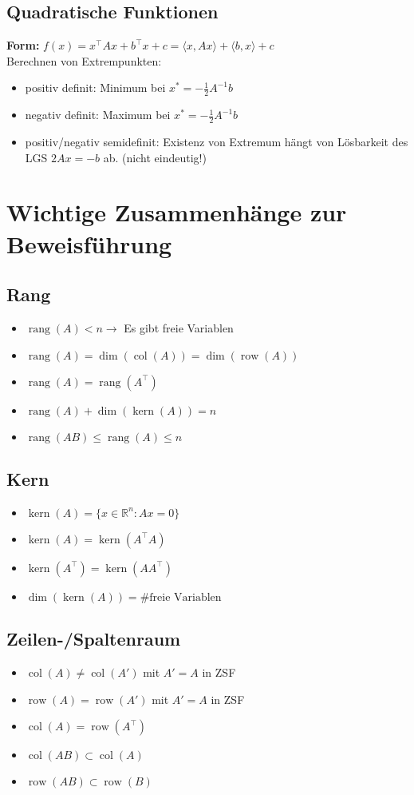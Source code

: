 \documentclass[german, 6pt]{latex4ei/latex4ei_sheet}
\DeclareMathOperator{\rang}{rang}
\DeclareMathOperator{\col}{col}
\DeclareMathOperator{\row}{row}
\DeclareMathOperator{\Kern}{kern}
\begin{document}
\subsection{Quadratische Funktionen}
\textbf{Form:} $f(x)=x^{\top}Ax+b^{\top}x+c = \langle x,Ax \rangle + \langle b,x \rangle + c$\\
Berechnen von Extrempunkten:
\begin{itemize}\itemsep0pt
\item positiv definit: Minimum bei $x^{*}=-\frac{1}{2}A^{-1}b$
\item negativ definit: Maximum bei $x^{*}=-\frac{1}{2}A^{-1}b$
\item positiv/negativ semidefinit: Existenz von Extremum hängt von Lösbarkeit des LGS $2Ax=-b$ ab. (nicht eindeutig!)
\end{itemize}

\begin{minipage}{\columnwidth}
\section{Wichtige Zusammenhänge zur Beweisführung}
\subsection{Rang}
\begin{itemize}
	\item $\rang(A)<n \rightarrow$ Es gibt freie Variablen
	\item $\rang(A)=\dim(\col(A))=\dim(\row(A))$
	\item $\rang(A)=\rang(A^\top)$
	\item $\rang(A)+\dim(\Kern(A))=n$
	\item $\rang(AB)\leq \rang(A) \leq n$
\end{itemize}
\end{minipage}
\subsection{Kern}
\begin{itemize}
	\item $\Kern(A)=\{x\in \mathbb{R}^n: Ax=0\}$
	\item $\Kern(A)=\Kern(A^\top A)$
	\item $\Kern(A^\top) = \Kern(AA^\top )$
	\item $\dim(\Kern(A))=\text{\#freie Variablen}$
\end{itemize}
\subsection{Zeilen-/Spaltenraum}
\begin{itemize}
	\item $\col(A)\neq \col(A')$ mit $A'=A$ in ZSF
	\item $\row(A)=\row(A')$ mit $A'=A$ in ZSF
	\item $\col(A)=\row(A^\top)$
	\item $\col(AB)\subset \col(A)$
	\item $\row(AB)\subset \row(B)$
\end{itemize}
\end{document}
